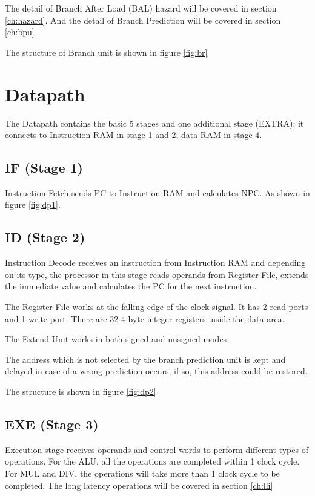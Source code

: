 The detail of Branch After Load (BAL) hazard will be covered in section \ref{ch:hazard}. And the
detail of Branch Prediction will be covered in section \ref{ch:bpu}

The structure of Branch unit is shown in figure \ref{fig:br}

\section[Datapath]{Datapath}
The Datapath contains the basic 5 stages and one additional stage (EXTRA); it connects to Instruction RAM
in stage 1 and 2; data RAM in stage 4.

\subsection[IF (Stage 1)]{IF (Stage 1)}
Instruction Fetch sends PC to Instruction RAM and calculates NPC. As shown in figure \ref{fig:dp1}.

\subsection[ID (Stage 2)]{ID (Stage 2)}
Instruction Decode receives an instruction from Instruction RAM and depending on its type, the processor in this stage
reads operands from Register File, extends the immediate value and calculates the PC for the next instruction.

The Register File works at the falling edge of the clock signal. It has 2 read ports and 1 write port. There are 32 4-byte integer registers
inside the data area.

The Extend Unit works in both signed and unsigned modes.

The address which is not selected by the branch prediction unit is kept and delayed in case of a wrong prediction occurs,
if so, this address could be restored.

The structure is shown in figure \ref{fig:dp2}

\subsection[EXE (Stage 3)]{EXE (Stage 3)}
Execution stage receives operands and control words to perform different types of operations. For the ALU, all the operations
are completed within 1 clock cycle. For MUL and DIV, the operations will take more than 1 clock cycle to be completed. The long
latency operations will be covered in section \ref{ch:lli}

